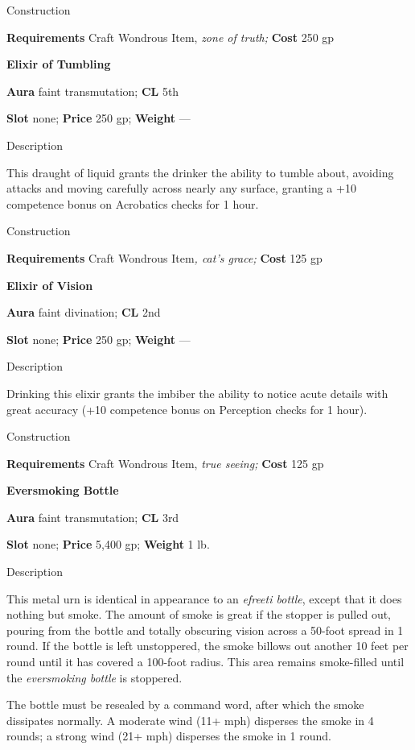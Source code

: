 Construction
				
\textbf{Requirements} Craft Wondrous Item,\textit{ zone of truth;}\textbf{ Cost }250 gp
				
\textbf{Elixir of Tumbling}
				
\textbf{Aura} faint transmutation;\textbf{ CL }5th
				
\textbf{Slot} none; \textbf{Price} 250 gp; \textbf{Weight }---
				
Description
				
This draught of liquid grants the drinker the ability to tumble about, avoiding attacks and moving carefully across nearly any surface, granting a +10 competence bonus on Acrobatics checks for 1 hour. 
				
Construction
				
\textbf{Requirements} Craft Wondrous Item\textit{, cat's grace;}\textbf{ Cost }125 gp
				
\textbf{Elixir of Vision}
				
\textbf{Aura} faint divination;\textbf{ CL }2nd
				
\textbf{Slot} none; \textbf{Price} 250 gp; \textbf{Weight }---
				
Description
				
Drinking this elixir grants the imbiber the ability to notice acute details with great accuracy (+10 competence bonus on Perception checks for 1 hour). 
				
Construction
				
\textbf{Requirements} Craft Wondrous Item,\textit{ true seeing;}\textbf{ Cost }125 gp
				
\textbf{Eversmoking Bottle}
				
\textbf{Aura} faint transmutation;\textbf{ CL }3rd
				
\textbf{Slot} none; \textbf{Price} 5,400 gp; \textbf{Weight} 1 lb.
				
Description
				
This metal urn is identical in appearance to an \textit{efreeti bottle}, except that it does nothing but smoke. The amount of smoke is great if the stopper is pulled out, pouring from the bottle and totally obscuring vision across a 50-foot spread in 1 round. If the bottle is left unstoppered, the smoke billows out another 10 feet per round until it has covered a 100-foot radius. This area remains smoke-filled until the \textit{eversmoking bottle} is stoppered.
				
The bottle must be resealed by a command word, after which the smoke dissipates normally. A moderate wind (11+ mph) disperses the smoke in 4 rounds; a strong wind (21+ mph) disperses the smoke in 1 round. 
				

